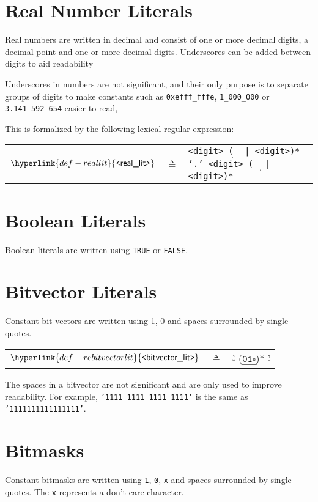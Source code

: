 \documentclass{book}
\newcommand\anycharacter[1]{$\underbracket{#1}$}
\newcommand\Underscore[0]{\anycharacter{\texttt{ \_ }}}
\newcommand\REdigit[0]{\hyperlink{def-redigit}{\texttt{<}\textsf{digit}\texttt{>}}}
\newcommand\REreallit[0]{\hyperlink{def-reallit}{\texttt{<}\textsf{real\_lit}\texttt{>}}}
\newcommand\REbitvectorlit[0]{\hyperlink{def-rebitvectorlit}{\texttt{<}\textsf{bitvector\_lit}\texttt{>}}}
\begin{document}
\section{Real Number Literals}
Real numbers are written in decimal and consist of one or more decimal digits, a decimal point and one
or more decimal digits. Underscores can be added between digits to aid readability

Underscores in numbers are not significant, and their only purpose is to separate groups of digits to make constants
such as \texttt{0xefff\_fffe}, \texttt{1\_000\_000} or \texttt{3.141\_592\_654} easier to read,

\hypertarget{def-reallit}{}
This is formalized by the following lexical regular expression:
\begin{center}
\begin{tabular}{rcl}
$\REreallit$ &$\triangleq$& \texttt{\REdigit\ (\Underscore\ | \REdigit)* '.' \REdigit\ (\Underscore\ | \REdigit)*}
\end{tabular}
\end{center}

\section{Boolean Literals}
Boolean literals are written using \texttt{TRUE} or \texttt{FALSE}.

\section{Bitvector Literals}
Constant bit-vectors are written using 1, 0 and spaces surrounded by single-quotes.
\hypertarget{def-rebitvectorlit}{}
\begin{center}
\begin{tabular}{rcl}
$\REbitvectorlit$ &$\triangleq$& \anycharacter{\texttt{'}} (\anycharacter{\texttt{01}\square})* \anycharacter{\texttt{'}}
\end{tabular}
\end{center}

The spaces in a bitvector are not significant and are only used to improve readability.
For example, \texttt{'1111 1111 1111 1111'} is the same as \texttt{'1111111111111111'}.

\section{Bitmasks}
Constant bitmasks are written using \texttt{1}, \texttt{0}, \texttt{x} and spaces surrounded by single-quotes.
The \texttt{x} represents a don’t care character.
\end{document}
